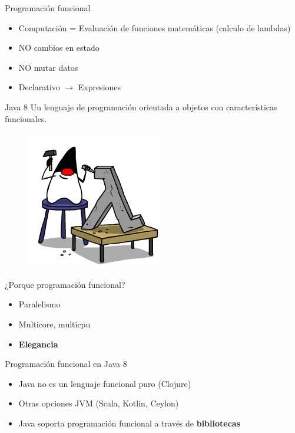 \documentclass{beamer}
\begin{document}
\begin{frame}{Programación funcional}
	\begin{itemize}
	\item Computación = Evaluación de funciones matemáticas (calculo de lambdas)
	\item NO cambios en estado
	\item NO mutar datos
	\item Declarativo $\to$ Expresiones 
	\end{itemize}
\end{frame}

\begin{frame}{Java 8}
Un lenguaje de programación orientada a objetos con características funcionales.
			\begin{figure}
			\centering
			\includegraphics[width=0.5\linewidth]{Images/JavaLam-1}
			\end{figure}
\end{frame}

\begin{frame}{¿Porque programación funcional?}
	\begin{itemize}
	\item Paralelismo
	\item Multicore, multicpu
	\item \textbf{Elegancia}
	\end{itemize}
\end{frame}

\begin{frame}{Programación funcional en Java 8}
	\begin{itemize}
	\item Java no es un lenguaje funcional puro (Clojure)
	\item Otras opciones JVM (Scala, Kotlin, Ceylon)
	\item Java soporta programación funcional a través de \textbf{bibliotecas}
	\end{itemize}
\end{frame}
\end{document}
